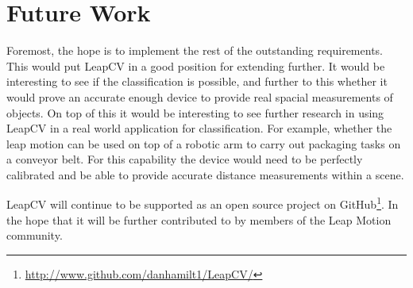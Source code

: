 \documentclass[11pt,oneside]{report}
\begin{document}
		\section{Future Work}
	Foremost, the hope is to implement the rest of the outstanding requirements.
	This would put LeapCV in a good position for extending further.
	It would be interesting to see if the classification is possible, and further to this whether it would prove an accurate enough device to provide real spacial measurements of objects.
	On top of this it would be interesting to see further research in using LeapCV in a real world application for classification.
	For example, whether the leap motion can be used on top of a robotic arm to carry out packaging tasks on a conveyor belt.
	For this capability the device would need to be perfectly calibrated and be able to provide accurate distance measurements within a scene.	

	LeapCV will continue to be supported as an open source project on GitHub\footnote{\url{http://www.github.com/danhamilt1/LeapCV/}}.
	In the hope that it will be further contributed to by members of the Leap Motion community.
	
\end{document}
